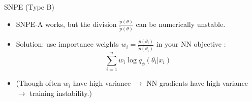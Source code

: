 \documentclass[12pt, aspectratio=169]{beamer}
\let\olditem\item
\renewcommand\item{\olditem\justifying}
\begin{document}

\begin{frame}{SNPE (Type B)}
\begin{itemize}[<+->]
    \item SNPE-A works, but the division $\frac{p(\theta)}{\tilde{p}(\theta)}$ can be numerically unstable.
    \item \alert{Solution}: use importance weights $w_i = \frac{p(\theta_i)}{\tilde{p}(\theta_i)}$ in your NN objective \parencite{lueckmann_flexible_2017}:
    $$\sum_{i=1}^n w_i \log q_\phi(\theta_i | x_i)$$

    \item (Though often $w_i$ have high variance $\to$ NN gradients have high variance $\to$ training instability.)
\end{itemize}

\end{frame}


\end{document}
